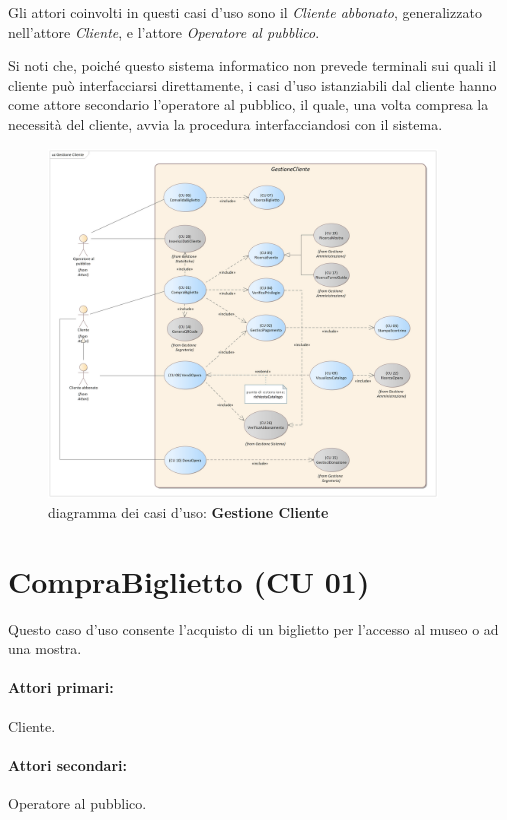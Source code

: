 \documentclass{article}
\begin{document}
\medskip
Gli attori coinvolti in questi casi d'uso sono il \emph{Cliente abbonato}, generalizzato nell'attore \emph{Cliente}, e l'attore \emph{Operatore al pubblico}.

\medskip
Si noti che, poiché questo sistema informatico non prevede terminali sui quali il cliente può interfacciarsi direttamente, i casi d'uso istanziabili dal cliente hanno come attore secondario l'operatore al pubblico, il quale, una volta compresa la necessità del cliente, avvia la procedura interfacciandosi con il sistema.

\begin{figure}[h]
    \centering
    \includegraphics[width=0.92\textwidth]{Gestione Cliente}
    \caption{diagramma dei casi d'uso: \textbf{Gestione Cliente}}
    \label{fig:GestioneCliente}
\end{figure}

	

	\section*{CompraBiglietto (CU 01)}
	
	\indent\indent Questo caso d'uso consente l'acquisto di un biglietto per l'accesso al museo o ad una mostra.
	
	\paragraph{Attori primari:}Cliente.
	
	\paragraph{Attori secondari:}Operatore al pubblico.
	
\end{document}
